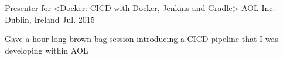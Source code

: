 \begin{cventries}
  \cventry
    {Presenter for <Docker: CICD with Docker, Jenkins and Gradle>}
    {AOL Inc.}
    {Dublin, Ireland}
    {Jul. 2015}
    {
      \begin{cvitems}
        \item {Gave a hour long brown-bag session introducing a CICD pipeline that I was developing within AOL}
      \end{cvitems}
    }
\end{cventries}
